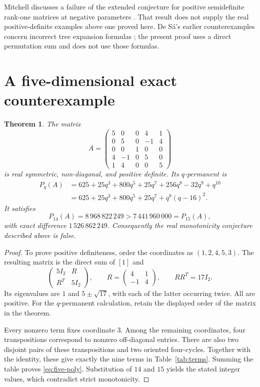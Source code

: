 \documentclass[11pt]{article}
\newtheorem{theorem}{Theorem}
\begin{document}
Mitchell discusses a failure of the extended conjecture for positive
semidefinite rank-one matrices at negative parameters \cite{mitchell}.
That result does not supply the real positive-definite examples above one
proved here. De S\'a's earlier counterexamples concern incorrect tree
expansion formulas \cite{desa}; the present proof uses a direct permutation
sum and does not use those formulas.

\section{A five-dimensional exact counterexample}
\begin{theorem}\label{thm:five}
The matrix
\[
 A=\begin{pmatrix}
 5&0&0&4&1\\
 0&5&0&-1&4\\
 0&0&1&0&0\\
 4&-1&0&5&0\\
 1&4&0&0&5
 \end{pmatrix}
\]
is real symmetric, non-diagonal, and positive definite. Its $q$-permanent is
\begin{align}\label{eq:five-poly}
 P_q(A)
 &=625+25q^3+800q^5+25q^7+256q^8-32q^9+q^{10}\\
 &=625+25q^3+800q^5+25q^7+q^8(q-16)^2.\nonumber
\end{align}
It satisfies
\[
 P_{14}(A)=8\,968\,822\,249
 >7\,441\,960\,000=P_{15}(A),
\]
with exact difference $1\,526\,862\,249$. Consequently the real monotonicity conjecture described above is false.
\end{theorem}
\begin{proof}
To prove positive definiteness, order the coordinates as $(1,2,4,5,3)$. The resulting matrix is the direct sum of $[1]$ and
\[
 \begin{pmatrix}5I_2&R\\R^T&5I_2\end{pmatrix},\qquad
 R=\begin{pmatrix}4&1\\-1&4\end{pmatrix},\qquad RR^T=17I_2.
\]
Its eigenvalues are $1$ and $5\pm\sqrt{17}$, with each of the latter occurring twice. All are positive. For the $q$-permanent calculation, retain the displayed order of the matrix in the theorem.

Every nonzero term fixes coordinate $3$. Among the remaining coordinates, four transpositions correspond to nonzero off-diagonal entries. There are also two disjoint pairs of these transpositions and two oriented four-cycles. Together with the identity, these give exactly the nine terms in Table~\ref{tab:terms}. Summing the table proves \eqref{eq:five-poly}. Substitution of $14$ and $15$ yields the stated integer values, which contradict strict monotonicity.
\end{proof}
\end{document}
